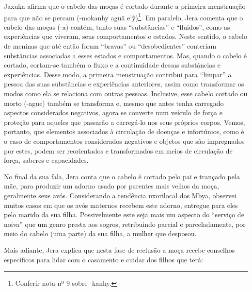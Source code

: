 \bigskip

Jaxuka afirma que o cabelo das moças é cortado durante a primeira
menstruação para que não se percam (-mokanhy aguã
e’\~{y})\footnote{Conferir nota nº 9 sobre -kanhy.}. Em paralelo,
Jera comenta que o cabelo das moças (-a) contém, tanto suas
``substâncias'' e ``fluidos'', como as experiências que viveram, seus
comportamentos e estados. Neste sentido, o cabelo de meninas que até
então foram ``bravas'' ou ``desobedientes'' conteriam substâncias
associadas a esses estados e comportamentos. Mas, quando o cabelo é
cortado, cortam-se também o fluxo e a continuidade dessas substâncias e
experiências. Desse modo, a primeira menstruação contribui para
``limpar'' a pessoa das suas substâncias e experiências anteriores, assim
como transformar os modos como ela se relaciona com outras pessoas.
Inclusive, esse cabelo cortado ou morto (-ague) também se transforma e,
mesmo que antes tenha carregado aspectos considerados negativos, agora
se converte num veículo de força e proteção para aqueles que passarão a
carregá-lo nos seus próprios corpos. Vemos, portanto, que elementos
associados à circulação de doenças e infortúnios, como é o caso de
comportamentos considerados negativos e objetos que são impregnados por
estes, podem ser reorientados e transformados em meios de circulação de
força, saberes e capacidades. 

No final da sua fala, Jera conta que o cabelo é cortado pelo pai e
trançado pela mãe, para produzir um adorno usado por parentes mais
velhos da moça, geralmente seus avós. Considerando a tendência
uxorilocal dos Mbya, observei muitos casos em que os avós maternos
recebem este adorno, entregue para eles pelo marido da sua filha.
Possivelmente este seja mais um aspecto do ``serviço de noiva'' que um
genro presta aos sogros, retribuindo parcial e parceladamente, por meio
do cabelo (uma parte) da sua filha, a mulher que desposou. 

Mais adiante, Jera explica que nesta fase de reclusão a moça recebe
conselhos específicos para lidar com o casamento e cuidar dos filhos
que terá: 

